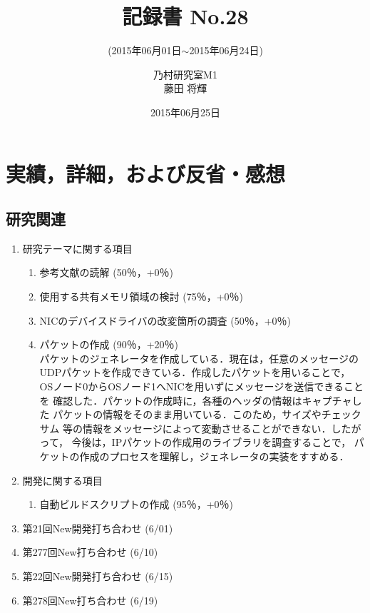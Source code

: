 \documentclass[fleqn, 14pt]{extarticlej}
\subtitle{(2015年06月01日$\sim$2015年06月24日)}
\author{乃村研究室M1\\藤田 将輝}
\date{2015年06月25日}
\title{記録書 No.28}
\begin{document}
\maketitle
\section{実績，詳細，および反省・感想}
\subsection{研究関連}
\label{sec-2-1}
\begin{enumerate}
    \item 研究テーマに関する項目
    \hfill
    \label{enum-research1}
    \begin{enumerate}
        \item 参考文献の読解
        \hfill
        \label{enum-1-A}
        (50％，+0％)
        \item 使用する共有メモリ領域の検討
        \hfill
        \label{enum-1-B}
        (75％，+0％)
        \item NICのデバイスドライバの改変箇所の調査
        \hfill
        \label{enum-1-C}
        (50％，+0％)
        \item パケットの作成
        \hfill
        \label{enum-1-D}
        (90％，+20％)\\
        パケットのジェネレータを作成している．現在は，任意のメッセージの
        UDPパケットを作成できている．作成したパケットを用いることで，
        OSノード0からOSノード1へNICを用いずにメッセージを送信できることを
        確認した．パケットの作成時に，各種のヘッダの情報はキャプチャした
        パケットの情報をそのまま用いている．このため，サイズやチェックサム
        等の情報をメッセージによって変動させることができない．したがって，
        今後は，IPパケットの作成用のライブラリを調査することで，
        パケットの作成のプロセスを理解し，ジェネレータの実装をすすめる．
  
    \end{enumerate}
    \item 開発に関する項目
    \hfill
    \label{enum-research2}
    \begin{enumerate}

        \item 自動ビルドスクリプトの作成
        \hfill
        \label{enum-2-A}
        (95％，+0％)
    \end{enumerate}
    \item 第21回New開発打ち合わせ
    \hfill
    \label{enum-research3}
    (6/01)
    \item 第277回New打ち合わせ
    \hfill
    \label{enum-research3}
    (6/10)
    \item 第22回New開発打ち合わせ
    \hfill
    \label{enum-research3}
    (6/15)
    \item 第278回New打ち合わせ
    \hfill
    \label{enum-research3}
    (6/19)

\end{enumerate}
\end{document}
